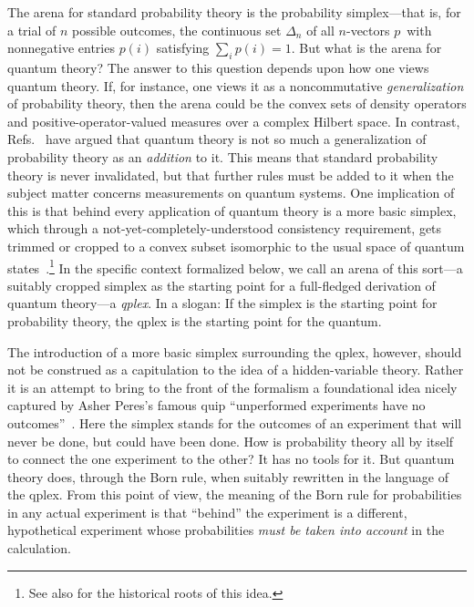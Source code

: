 \documentclass[aps,pra,superscriptaddress,10pt,tightenlines,twocolumn,nofootinbib]{revtex4}
\theoremstyle{remark}
\begin{document}
The arena for standard probability theory is the probability simplex---that is, for a trial of $n$ possible outcomes, the continuous set $\Delta_n$ of all $n$-vectors ${p}\,$ with nonnegative entries $p(i)$ satisfying $\sum_i p(i)=1$.  But what is the arena for quantum theory?  The answer to this question depends upon how one views quantum theory.  If, for instance, one views it as a noncommutative {\it generalization\/} of probability theory, then the arena could be the convex sets of density operators and positive-operator-valued measures over a complex Hilbert space. In contrast, Refs.\ \cite{fuchs2013,fuchs2009,Voldemort} have argued that quantum theory is not so much a generalization of probability theory as an {\it addition\/} to it.  This means that standard probability theory is never invalidated, but that further rules must be added to it when the subject matter concerns measurements on quantum systems.  One implication of this is that behind every application of quantum theory is a more basic simplex, which through a not-yet-completely-understood consistency requirement, gets trimmed or cropped to a convex subset isomorphic to the usual space of quantum states~\cite{fuchs2002}.\footnote{See also \cite[p.\ 487]{fuchs2010} for the historical roots of this idea.} In the specific context formalized below, we call an arena of this sort---a suitably cropped simplex as the starting point for a full-fledged derivation of quantum theory---a {\it qplex}.  In a slogan: If the simplex is the starting point for probability theory, the qplex is the starting point for the quantum.

The introduction of a more basic simplex surrounding the qplex, however, should not be construed as a capitulation to the idea of a hidden-variable theory.  Rather it is an attempt to bring to the front of the formalism a foundational idea nicely captured by Asher Peres's famous quip ``unperformed experiments have no outcomes''~\cite{Peres78}.  Here the simplex stands for the outcomes of an experiment that will never be done, but could have been done.  How is probability theory all by itself to connect the one experiment to the other?  It has no tools for it.  But quantum theory does, through the Born rule, when suitably rewritten in the language of the qplex.  From this point of view, the meaning of the Born rule for probabilities in any actual experiment is that ``behind'' the experiment is a different, hypothetical experiment whose probabilities {\it must be taken into account\/} in the calculation.
\end{document}
